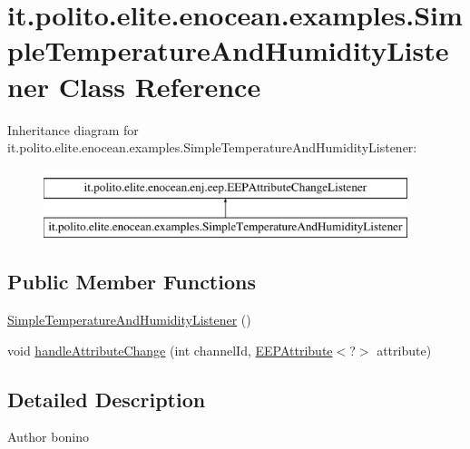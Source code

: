 \hypertarget{classit_1_1polito_1_1elite_1_1enocean_1_1examples_1_1_simple_temperature_and_humidity_listener}{}\section{it.\+polito.\+elite.\+enocean.\+examples.\+Simple\+Temperature\+And\+Humidity\+Listener Class Reference}
\label{classit_1_1polito_1_1elite_1_1enocean_1_1examples_1_1_simple_temperature_and_humidity_listener}
Inheritance diagram for it.\+polito.\+elite.\+enocean.\+examples.\+Simple\+Temperature\+And\+Humidity\+Listener\+:\begin{figure}[H]
\begin{center}
\leavevmode
\includegraphics[height=2.000000cm]{classit_1_1polito_1_1elite_1_1enocean_1_1examples_1_1_simple_temperature_and_humidity_listener}
\end{center}
\end{figure}
\subsection*{Public Member Functions}
\begin{DoxyCompactItemize}
\item 
\hyperlink{classit_1_1polito_1_1elite_1_1enocean_1_1examples_1_1_simple_temperature_and_humidity_listener_a84bf7ff39891850daaa5193641655c46}{Simple\+Temperature\+And\+Humidity\+Listener} ()
\item 
void \hyperlink{classit_1_1polito_1_1elite_1_1enocean_1_1examples_1_1_simple_temperature_and_humidity_listener_a8678c45e00f13cd428e12dabc463d853}{handle\+Attribute\+Change} (int channel\+Id, \hyperlink{classit_1_1polito_1_1elite_1_1enocean_1_1enj_1_1eep_1_1_e_e_p_attribute}{E\+E\+P\+Attribute}$<$?$>$ attribute)
\end{DoxyCompactItemize}


\subsection{Detailed Description}
\begin{DoxyAuthor}{Author}
bonino 
\end{DoxyAuthor}


